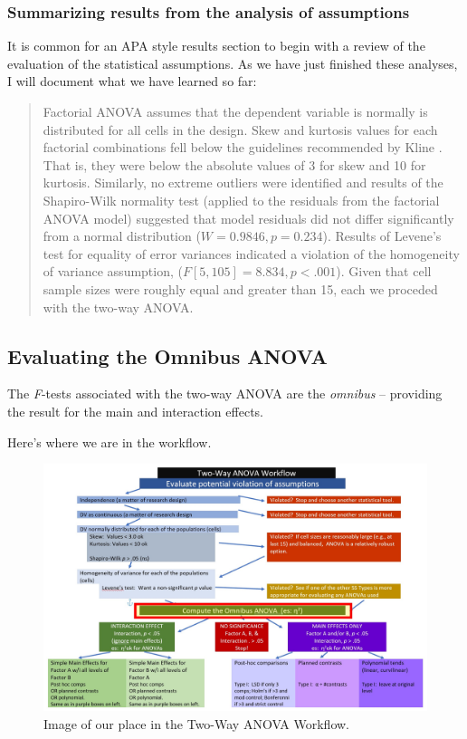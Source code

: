 \documentclass[
  11pt,
]{book}
\begin{document}
\hypertarget{summarizing-results-from-the-analysis-of-assumptions-1}{%
\subsubsection{Summarizing results from the analysis of assumptions}\label{summarizing-results-from-the-analysis-of-assumptions-1}}

It is common for an APA style results section to begin with a review of the evaluation of the statistical assumptions. As we have just finished these analyses, I will document what we have learned so far:

\begin{quote}
Factorial ANOVA assumes that the dependent variable is normally is distributed for all cells in the design. Skew and kurtosis values for each factorial combinations fell below the guidelines recommended by Kline \citeyearpar{kline_data_2016}. That is, they were below the absolute values of 3 for skew and 10 for kurtosis. Similarly, no extreme outliers were identified and results of the Shapiro-Wilk normality test (applied to the residuals from the factorial ANOVA model) suggested that model residuals did not differ significantly from a normal distribution (\(W = 0.9846, p = 0.234\)). Results of Levene's test for equality of error variances indicated a violation of the homogeneity of variance assumption, (\(F[5, 105] = 8.834, p < .001\)). Given that cell sample sizes were roughly equal and greater than 15, each \citep{green_using_2017} we proceded with the two-way ANOVA.
\end{quote}

\hypertarget{evaluating-the-omnibus-anova}{%
\subsection{Evaluating the Omnibus ANOVA}\label{evaluating-the-omnibus-anova}}

The \emph{F}-tests associated with the two-way ANOVA are the \emph{omnibus} -- providing the result for the main and interaction effects.

Here's where we are in the workflow.

\begin{figure}
\centering
\includegraphics{images/factorial/WrkFlw_Omnibus.jpg}
\caption{Image of our place in the Two-Way ANOVA Workflow.}
\end{figure}
\end{document}
